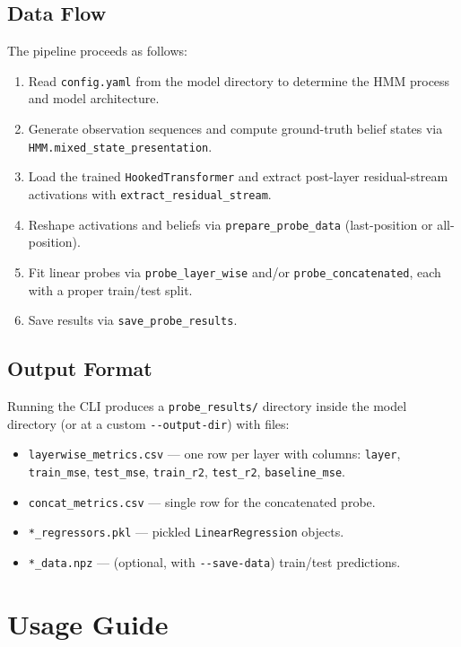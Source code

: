 \documentclass[11pt]{article}
\newcommand{\code}[1]{\texttt{#1}}
\newcommand{\file}[1]{\texttt{#1}}
\begin{document}
\subsection{Data Flow}

The pipeline proceeds as follows:
\begin{enumerate}
  \item Read \file{config.yaml} from the model directory to determine the HMM process and model architecture.
  \item Generate observation sequences and compute ground-truth belief states via \code{HMM.mixed\_state\_presentation}.
  \item Load the trained \code{HookedTransformer} and extract post-layer residual-stream activations with \code{extract\_residual\_stream}.
  \item Reshape activations and beliefs via \code{prepare\_probe\_data} (last-position or all-position).
  \item Fit linear probes via \code{probe\_layer\_wise} and/or \code{probe\_concatenated}, each with a proper train/test split.
  \item Save results via \code{save\_probe\_results}.
\end{enumerate}

\subsection{Output Format}

Running the CLI produces a \file{probe\_results/} directory inside the model directory (or at a custom \code{-{}-output-dir}) with files:
\begin{itemize}
  \item \file{layerwise\_metrics.csv} --- one row per layer with columns: \code{layer}, \code{train\_mse}, \code{test\_mse}, \code{train\_r2}, \code{test\_r2}, \code{baseline\_mse}.
  \item \file{concat\_metrics.csv} --- single row for the concatenated probe.
  \item \file{*\_regressors.pkl} --- pickled \code{LinearRegression} objects.
  \item \file{*\_data.npz} --- (optional, with \code{-{}-save-data}) train/test predictions.
\end{itemize}

\section{Usage Guide}
\end{document}
